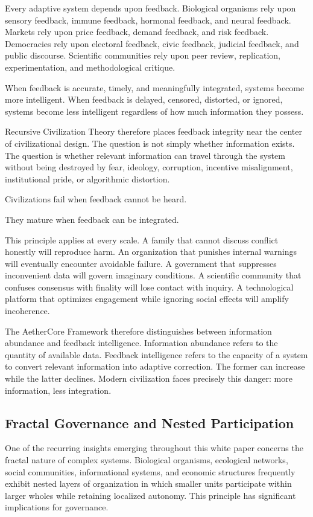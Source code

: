 \documentclass[12pt]{article}
\begin{document}
Every adaptive system depends upon feedback. Biological organisms rely upon sensory feedback, immune feedback, hormonal feedback, and neural feedback. Markets rely upon price feedback, demand feedback, and risk feedback. Democracies rely upon electoral feedback, civic feedback, judicial feedback, and public discourse. Scientific communities rely upon peer review, replication, experimentation, and methodological critique.

When feedback is accurate, timely, and meaningfully integrated, systems become more intelligent. When feedback is delayed, censored, distorted, or ignored, systems become less intelligent regardless of how much information they possess.

Recursive Civilization Theory therefore places feedback integrity near the center of civilizational design. The question is not simply whether information exists. The question is whether relevant information can travel through the system without being destroyed by fear, ideology, corruption, incentive misalignment, institutional pride, or algorithmic distortion.

Civilizations fail when feedback cannot be heard.

They mature when feedback can be integrated.

This principle applies at every scale. A family that cannot discuss conflict honestly will reproduce harm. An organization that punishes internal warnings will eventually encounter avoidable failure. A government that suppresses inconvenient data will govern imaginary conditions. A scientific community that confuses consensus with finality will lose contact with inquiry. A technological platform that optimizes engagement while ignoring social effects will amplify incoherence.

The AetherCore Framework therefore distinguishes between information abundance and feedback intelligence. Information abundance refers to the quantity of available data. Feedback intelligence refers to the capacity of a system to convert relevant information into adaptive correction. The former can increase while the latter declines. Modern civilization faces precisely this danger: more information, less integration.

\subsection{Fractal Governance and Nested Participation}

One of the recurring insights emerging throughout this white paper concerns the fractal nature of complex systems. Biological organisms, ecological networks, social communities, informational systems, and economic structures frequently exhibit nested layers of organization in which smaller units participate within larger wholes while retaining localized autonomy. This principle has significant implications for governance.
\end{document}
